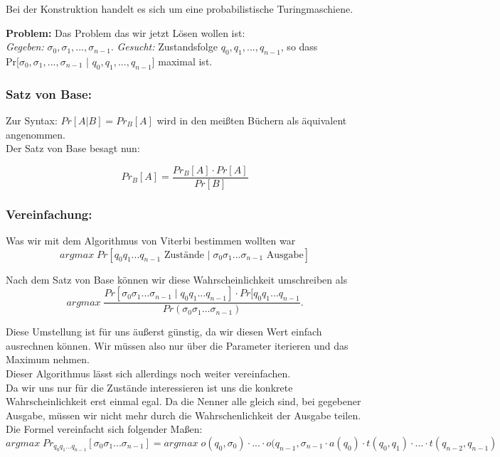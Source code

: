 Bei der Konstruktion handelt es sich um eine probabilistische Turingmaschiene.

\textbf{Problem: } Das Problem das wir jetzt Lösen wollen ist:\\
\emph{Gegeben:} $\sigma_0, \sigma_1,...,  \sigma_{n-1}$.
\emph{Gesucht:} Zustandsfolge $q_0,q_1, ..., q_{n-1}$, so dass\\
Pr[$\sigma_0, \sigma_1, ... , \sigma_{n-1}$ | $q_0, q_1 , ... , q_{n-1}$] maximal ist.

\subsubsection{Satz von Base:}

Zur Syntax: $Pr [A | B] = Pr_B [A]$ wird in den meißten Büchern als äquivalent angenommen.\\

Der Satz von Base besagt nun:

$$
Pr_B [A] = \frac{Pr_B [A]  \cdot Pr[A]}{Pr[B]}
$$

\subsubsection{Vereinfachung:}

Was wir mit dem Algorithmus von Viterbi bestimmen wollten war
$$
argmax \; Pr[q_0q_1 ... q_{n-1} \text{ Zustände } | \; \sigma_0 \sigma_1 ... \sigma_{n-1} \text{ Ausgabe} ]
$$

Nach dem Satz von Base können wir diese Wahrscheinlichkeit umschreiben als
$$
argmax \; \frac{Pr [\sigma_0\sigma_1 ... \sigma_{n-1} \; | \; q_0q_1 ... q_{n-1}] \cdot Pr[q_0q_1...q_{n-1}}{Pr(\sigma_0\sigma_1...\sigma_{n-1})}.
$$

Diese Umstellung ist für uns äußerst günstig, da wir diesen Wert einfach ausrechnen können. Wir müssen also nur über die Parameter iterieren und das Maximum nehmen.\\

Dieser Algorithmus lässt sich allerdings noch weiter vereinfachen.\\
Da wir uns nur für die Zustände interessieren ist uns die konkrete Wahrscheinlichkeit erst einmal egal. Da die Nenner alle gleich sind, bei gegebener Ausgabe, müssen wir nicht mehr durch die Wahrschenlichkeit der Ausgabe teilen. Die Formel vereinfacht sich folgender Maßen:
$$
argmax \; Pr_{q_0q_1...q_{n-1}} [\sigma_0 \sigma_1 ... \sigma_{n-1}] = argmax \; o(q_0,\sigma_0) \cdot ... \cdot o(q_{n-1},\sigma_{n-1} \cdot a(q_0) \cdot t(q_0,q_1) \cdot ... \cdot t(q_{n-2},q_{n-1})
$$

